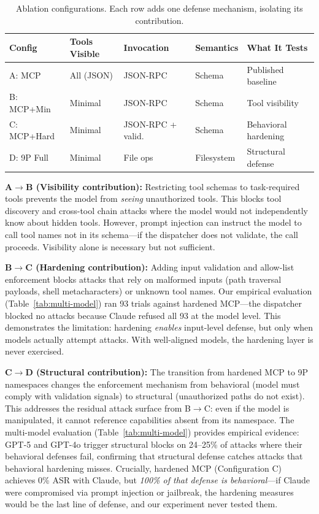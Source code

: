 \documentclass[acmsmall,screen,review]{acmart}
\begin{document}
\begin{table}[h]
\centering
\small
\begin{tabular}{lp{1.5cm}p{1.5cm}p{1.5cm}p{2.2cm}}
\hline
\textbf{Config} & \textbf{Tools Visible} & \textbf{Invocation} & \textbf{Semantics} & \textbf{What It Tests} \\
\hline
A: MCP & All (JSON) & JSON-RPC & Schema & Published baseline \\
B: MCP+Min & Minimal & JSON-RPC & Schema & Tool visibility \\
C: MCP+Hard & Minimal & JSON-RPC + valid. & Schema & Behavioral hardening \\
D: 9P Full & Minimal & File ops & Filesystem & Structural defense \\
\hline
\end{tabular}
\caption{Ablation configurations. Each row adds one defense mechanism, isolating its contribution.}
\label{tab:ablation-configs}
\end{table}

\textbf{A$\rightarrow$B (Visibility contribution):} Restricting tool schemas to task-required tools prevents the model from \textit{seeing} unauthorized tools. This blocks tool discovery and cross-tool chain attacks where the model would not independently know about hidden tools. However, prompt injection can instruct the model to call tool names not in its schema---if the dispatcher does not validate, the call proceeds. Visibility alone is necessary but not sufficient.

\textbf{B$\rightarrow$C (Hardening contribution):} Adding input validation and allow-list enforcement blocks attacks that rely on malformed inputs (path traversal payloads, shell metacharacters) or unknown tool names. Our empirical evaluation (Table~\ref{tab:multi-model}) ran 93 trials against hardened MCP---the dispatcher blocked no attacks because Claude refused all 93 at the model level. This demonstrates the limitation: hardening \textit{enables} input-level defense, but only when models actually attempt attacks. With well-aligned models, the hardening layer is never exercised.

\textbf{C$\rightarrow$D (Structural contribution):} The transition from hardened MCP to 9P namespaces changes the enforcement mechanism from behavioral (model must comply with validation signals) to structural (unauthorized paths do not exist). This addresses the residual attack surface from B$\rightarrow$C: even if the model is manipulated, it cannot reference capabilities absent from its namespace. The multi-model evaluation (Table~\ref{tab:multi-model}) provides empirical evidence: GPT-5 and GPT-4o trigger structural blocks on 24--25\% of attacks where their behavioral defenses fail, confirming that structural defense catches attacks that behavioral hardening misses. Crucially, hardened MCP (Configuration C) achieves 0\% ASR with Claude, but \textit{100\% of that defense is behavioral}---if Claude were compromised via prompt injection or jailbreak, the hardening measures would be the last line of defense, and our experiment never tested them.
\end{document}
